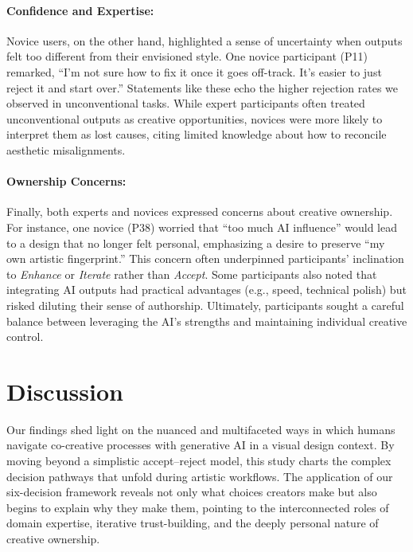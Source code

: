 \documentclass[letterpaper]{article} %
\begin{document}
\paragraph{Confidence and Expertise:} Novice users, on the other hand, highlighted a sense of uncertainty when outputs felt too different from their envisioned style. One novice participant (P11) remarked, “I’m not sure how to fix it once it goes off-track. It’s easier to just reject it and start over.” Statements like these echo the higher rejection rates we observed in unconventional tasks. While expert participants often treated unconventional outputs as creative opportunities, novices were more likely to interpret them as lost causes, citing limited knowledge about how to reconcile aesthetic misalignments.

\paragraph{Ownership Concerns:} Finally, both experts and novices expressed concerns about creative ownership. For instance, one novice (P38) worried that “too much AI influence” would lead to a design that no longer felt personal, emphasizing a desire to preserve “my own artistic fingerprint.” This concern often underpinned participants’ inclination to \textit{Enhance} or \textit{Iterate} rather than \textit{Accept}. Some participants also noted that integrating AI outputs had practical advantages (e.g., speed, technical polish) but risked diluting their sense of authorship. Ultimately, participants sought a careful balance between leveraging the AI’s strengths and maintaining individual creative control.

\section{Discussion}

Our findings shed light on the nuanced and multifaceted ways in which humans navigate co-creative processes with generative AI in a visual design context. By moving beyond a simplistic accept–reject model, this study charts the complex decision pathways that unfold during artistic workflows. The application of our six-decision framework reveals not only what choices creators make but also begins to explain why they make them, pointing to the interconnected roles of domain expertise, iterative trust-building, and the deeply personal nature of creative ownership.
\end{document}
